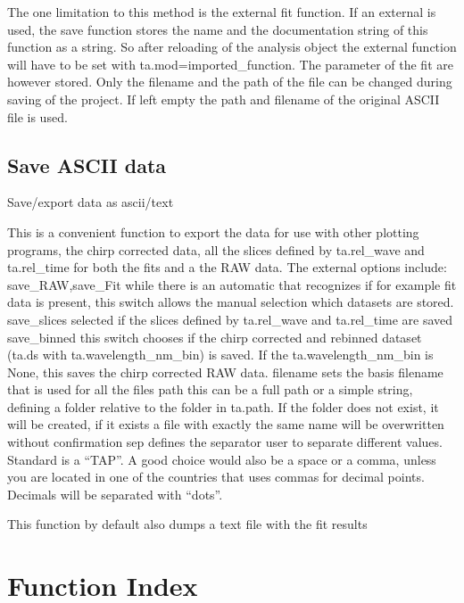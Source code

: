 \documentclass[letterpaper,10pt,english]{sphinxmanual}
\begin{document}
The one limitation to this method is the external fit function. If an
external  is used, the save function stores the name and the
documentation string of this function as a string. So after reloading of
the analysis object the external function will have to be set with
ta.mod=imported\_function. The parameter of the fit are however stored.
Only the filename and the path of the file can be changed during saving
of the project. If left empty the path and filename of the original
ASCII file is used.


\section{Save ASCII data}
\label{\detokenize{Saving:save-ascii-data}}
Save/export data as ascii/text  {\hyperref[\detokenize{plot_func:plot_func.TA.Save_data}]{}}

This is a convenient function to export the data for use with other
plotting programs, the chirp corrected data, all the slices defined by
ta.rel\_wave and ta.rel\_time for both the fits and a the RAW data. The
external options include: save\_RAW,save\_Fit while there is an
automatic that recognizes if for example fit data is present, this
switch allows the manual selection which datasets are stored.
save\_slices selected if the slices defined by ta.rel\_wave and
ta.rel\_time are saved save\_binned this switch chooses if the chirp
corrected and rebinned dataset (ta.ds with ta.wavelength\_nm\_bin) is
saved. If the ta.wavelength\_nm\_bin is None, this saves the chirp
corrected RAW data. filename sets the basis filename that is used for
all the files path this can be a full path or a simple string,
defining a folder relative to the folder in ta.path. If the folder
does not exist, it will be created, if it exists a file with exactly
the same name will be overwritten without confirmation sep defines the
separator user to separate different values. Standard is a “TAP”. A good
choice would also be a space or a comma, unless you are
located in one of the countries that uses commas for decimal points.
Decimals will be separated with “dots”.

This function by default also dumps a text file with the fit results


\chapter{Function Index}
\label{\detokenize{genindex:function-index}}\label{\detokenize{genindex::doc}}
\end{document}
